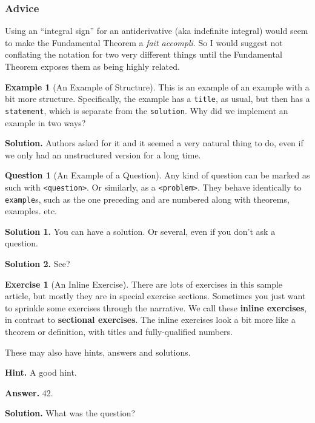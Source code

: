 \documentclass[10pt,]{article}
\newcommand{\terminology}[1]{\textbf{#1}}
\theoremstyle{plain}
\theoremstyle{definition}
\theoremstyle{definition}
\theoremstyle{definition}
\theoremstyle{definition}
\newtheorem{example}[theorem]{Example}
\newtheorem{question}[theorem]{Question}
\theoremstyle{definition}
\theoremstyle{definition}
\newtheorem{exercise}[theorem]{Exercise}
\numberwithin{equation}{section}
\begin{document}
\subsubsection[{Advice}]{Advice}\label{subsubsection-3}
\hypertarget{p-51}{}%
Using an ``integral sign'' for an antiderivative (aka indefinite integral) would seem to make the Fundamental Theorem a \textit{fait accompli}.  So I would suggest not conflating the notation for two very different things until the Fundamental Theorem exposes them as being highly related.%
\begin{example}[An Example of Structure]\label{example-structured}
\hypertarget{p-52}{}%
This is an example of an example with a bit more structure.  Specifically, the example has a \lstinline?title?, as usual, but then has a \lstinline?statement?, which is separate from the \lstinline?solution?.  Why did we implement an example in two ways?%
\par\smallskip%
\noindent\textbf{Solution.}\hypertarget{solution-1}{}\quad%
\hypertarget{p-53}{}%
Authors asked for it and it seemed a very natural thing to do, even if we only had an unstructured version for a long time.%
\end{example}
\begin{question}[An Example of a Question]\label{sample-question}
\hypertarget{p-54}{}%
Any kind of question can be marked as such with \lstinline?<question>?.  Or similarly, as a \lstinline?<problem>?.  They behave identically to \lstinline?example?s, such as the one preceding and are numbered along with theorems, examples. etc.%
\par\smallskip%
\noindent\textbf{Solution 1.}\hypertarget{solution-2}{}\quad%
\hypertarget{p-55}{}%
You can have a solution. Or several, even if you don't ask a question.%
\par\smallskip%
\noindent\textbf{Solution 2.}\hypertarget{solution-3}{}\quad%
\hypertarget{p-56}{}%
See?%
\end{question}
\begin{exercise}[{An Inline Exercise}]\label{exercise-2}
\hypertarget{p-57}{}%
There are lots of exercises in this sample article, but mostly they are in special exercise sections.  Sometimes you just want to sprinkle some exercises through the narrative.  We call these \terminology{inline exercises}, in contrast to \terminology{sectional exercises}.  The inline exercises look a bit more like a theorem or definition, with titles and fully-qualified numbers.%
\par
\hypertarget{p-58}{}%
These may also have hints, answers and solutions.%
\par\smallskip%
\noindent\textbf{Hint.}\hypertarget{hint-2}{}\quad%
\hypertarget{p-59}{}%
A good hint.%
\par\smallskip%
\noindent\textbf{Answer.}\hypertarget{answer-1}{}\quad%
\hypertarget{p-60}{}%
42.%
\par\smallskip%
\noindent\textbf{Solution.}\hypertarget{solution-4}{}\quad%
\hypertarget{p-61}{}%
What was the question?%
\end{exercise}
\end{document}
